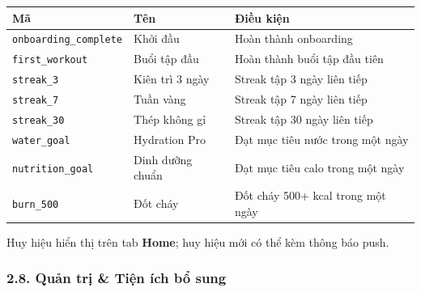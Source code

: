 \documentclass[12pt,a4paper]{article}
\newcounter{none}
\begin{document}
{\def\LTcaptype{none} %
\begin{longtable}[]{@{}
  >{\raggedright\arraybackslash}p{}
  >{\raggedright\arraybackslash}p{}
  >{\raggedright\arraybackslash}p{}@{}}
\toprule\noalign{}
\begin{minipage}[b]{\linewidth}\raggedright
Mã
\end{minipage} & \begin{minipage}[b]{\linewidth}\raggedright
Tên
\end{minipage} & \begin{minipage}[b]{\linewidth}\raggedright
Điều kiện
\end{minipage} \\
\midrule\noalign{}
\endhead
\bottomrule\noalign{}
\endlastfoot
\texttt{onboarding\_complete} & Khởi đầu & Hoàn thành onboarding \\
\texttt{first\_workout} & Buổi tập đầu & Hoàn thành buổi tập đầu tiên \\
\texttt{streak\_3} & Kiên trì 3 ngày & Streak tập 3 ngày liên tiếp \\
\texttt{streak\_7} & Tuần vàng & Streak tập 7 ngày liên tiếp \\
\texttt{streak\_30} & Thép không gỉ & Streak tập 30 ngày liên tiếp \\
\texttt{water\_goal} & Hydration Pro & Đạt mục tiêu nước trong một
ngày \\
\texttt{nutrition\_goal} & Dinh dưỡng chuẩn & Đạt mục tiêu calo trong
một ngày \\
\texttt{burn\_500} & Đốt cháy & Đốt cháy 500+ kcal trong một ngày \\
\end{longtable}
}

Huy hiệu hiển thị trên tab \textbf{Home}; huy hiệu mới có thể kèm thông
báo push.

\subsubsection{2.8. Quản trị \& Tiện ích bổ
sung}\label{quux1ea3n-trux1ecb-tiux1ec7n-uxedch-bux1ed5-sung}
\end{document}
